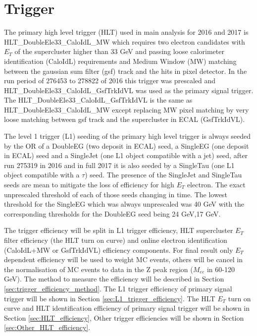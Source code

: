 \section{Trigger}\label{sec:Zprime_trigger}
The primary high level trigger (HLT) used in main analysis for 2016 and 2017 is HLT\_DoubleEle33\_CaloIdL\_MW which requires two electron candidates with $E_{T}$ of the supercluster higher than 33 GeV and passing loose calorimeter identification (CaloIdL) requirements and Medium Window (MW) matching between the gaussian sum filter (gsf) \cite{0954-3899-31-9-N01} track and the hits in pixel detector. In the run period of 276453 to 278822 of 2016 this trigger was prescaled and HLT\_DoubleEle33\_CaloIdL\_GsfTrkIdVL was used as the primary signal trigger. The HLT\_DoubleEle33\_CaloIdL\_GsfTrkIdVL is the same as HLT\_DoubleEle33\_CaloIdL\_MW except replacing MW pixel matching by very loose matching between gsf track and the supercluster in ECAL (GsfTrkIdVL).

The level 1 trigger (L1) seeding of the primary high level trigger is always seeded by the OR of a DoubleEG (two deposit in ECAL) seed, a SingleEG (one deposit in ECAL) seed and a SingleJet (one L1 object compatible with a jet) seed, after run 275319 in 2016 and in full 2017 it is also seeded by a SingleTau (one L1 object compatible with a $\tau$) seed. The presence of the SingleJet and SingleTau seeds are mean to mitigate the loss of efficiency for high $E_{T}$ electron. The exact unprescaled threshold of each of those seeds changing in time. The lowest threshold for the SingleEG which was always unprescaled was 40 GeV with the corresponding thresholds for the DoubleEG seed being 24 GeV,17 GeV.

The trigger efficiency will be split in L1 trigger efficiency, HLT supercluster $E_{T}$ filter efficiency (the HLT turn on curve) and online electron identification (CaloIdL+MW or GsfTrkIdVL) efficiency components. For final result only $E_{T}$ dependent efficiency will be used to weight MC events, others will be cancel in the normalisation of MC events to data in the Z peak region ($M_{ee}$ in 60-120 GeV). The method to measure the efficiency will be described in Section \ref{sec:trigger_efficiency_method}. The L1 trigger efficiency of primary signal trigger will be shown in Section \ref{sec:L1_trigger_efficiency}. The HLT $E_{T}$ turn on curve and HLT identification efficiency of primary signal trigger will be shown in Section \ref{sec:HLT_efficiency}, Other trigger efficiencies will be shown in Section \ref{sec:Other_HLT_efficiency}.

